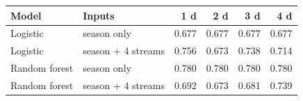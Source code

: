 \begin{tabular}{@{}llrrrr@{}}
\toprule
Model & Inputs & 1 d & 2 d & 3 d & 4 d \\
\midrule
Logistic & season only & 0.677 & 0.677 & 0.677 & 0.677 \\
Logistic & season + 4 streams & 0.756 & 0.673 & 0.738 & 0.714 \\
\midrule
Random forest & season only & 0.780 & 0.780 & 0.780 & 0.780 \\
Random forest & season + 4 streams & 0.692 & 0.673 & 0.681 & 0.739 \\
\bottomrule
\end{tabular}

